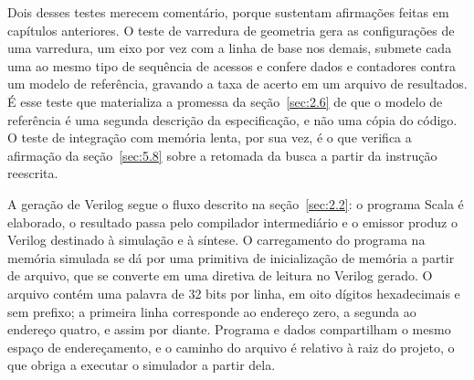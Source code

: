 Dois desses testes merecem comentário, porque sustentam afirmações feitas em capítulos anteriores. O teste de varredura de geometria gera as configurações de uma varredura, um eixo por vez com a linha de base nos demais, submete cada uma ao mesmo tipo de sequência de acessos e confere dados e contadores contra um modelo de referência, gravando a taxa de acerto em um arquivo de resultados. É esse teste que materializa a promessa da seção~\ref{sec:2.6} de que o modelo de referência é uma segunda descrição da especificação, e não uma cópia do código. O teste de integração com memória lenta, por sua vez, é o que verifica a afirmação da seção~\ref{sec:5.8} sobre a retomada da busca a partir da instrução reescrita.

A geração de Verilog segue o fluxo descrito na seção~\ref{sec:2.2}: o programa Scala é elaborado, o resultado passa pelo compilador intermediário e o emissor produz o Verilog destinado à simulação e à síntese. O carregamento do programa na memória simulada se dá por uma primitiva de inicialização de memória a partir de arquivo, que se converte em uma diretiva de leitura no Verilog gerado. O arquivo contém uma palavra de 32 bits por linha, em oito dígitos hexadecimais e sem prefixo; a primeira linha corresponde ao endereço zero, a segunda ao endereço quatro, e assim por diante. Programa e dados compartilham o mesmo espaço de endereçamento, e o caminho do arquivo é relativo à raiz do projeto, o que obriga a executar o simulador a partir dela.
